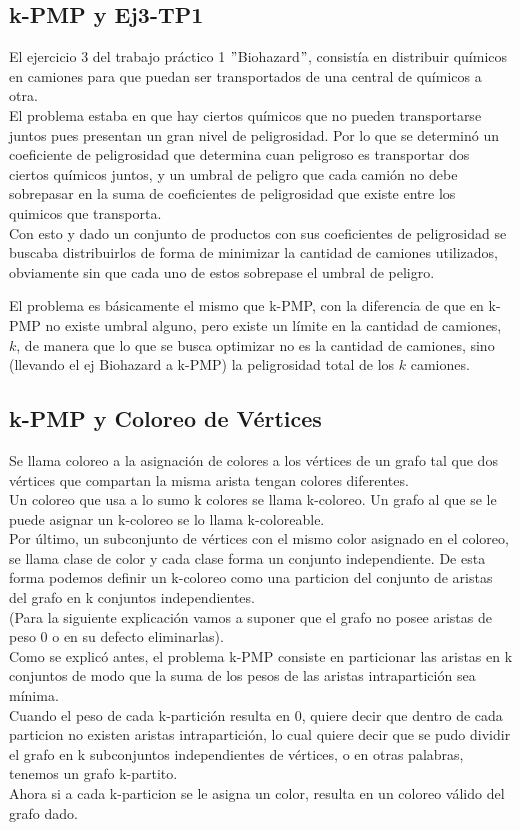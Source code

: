 \subsection{k-PMP y Ej3-TP1}

El ejercicio 3 del trabajo práctico 1 $"$Biohazard$"$, consistía en distribuir químicos en camiones para que puedan ser transportados de una central de químicos a otra.\\
El problema estaba en que hay ciertos químicos que no pueden transportarse juntos pues presentan un gran nivel de peligrosidad. Por lo que se determinó un coeficiente de peligrosidad que determina cuan peligroso es transportar dos ciertos químicos juntos, y un umbral de peligro que cada camión no debe sobrepasar en la suma de coeficientes de peligrosidad que existe entre los quimicos que transporta.\\
Con esto y dado un conjunto de productos con sus coeficientes de peligrosidad se buscaba distribuirlos de forma de minimizar la cantidad de camiones utilizados, obviamente sin que cada uno de estos sobrepase el umbral de peligro.

El problema es b\'asicamente el mismo que k-PMP, con la diferencia de que en k-PMP no existe umbral alguno, pero existe un l\'imite en la cantidad de camiones, $k$, de manera que lo que se busca optimizar no es la cantidad de camiones, sino (llevando el ej Biohazard a k-PMP) la peligrosidad total de los $k$ camiones.


\subsection{k-PMP y Coloreo de Vértices}

Se llama coloreo a la asignación de colores a los vértices de un grafo tal que dos vértices que compartan la misma arista tengan colores diferentes.\\
Un coloreo que usa a lo sumo k colores se llama k-coloreo. Un grafo al que se le puede asignar un k-coloreo se lo llama k-coloreable.\\
Por \'ultimo, un subconjunto de v\'ertices con el mismo color asignado en el coloreo, se llama clase de color y cada clase forma un conjunto independiente. De esta forma podemos definir un k-coloreo como una particion del conjunto de aristas del grafo en k conjuntos independientes.\\

(Para la siguiente explicaci\'on vamos a suponer que el grafo no posee aristas de peso 0 o en su defecto eliminarlas).\\
Como se explicó antes, el problema k-PMP consiste en particionar las aristas en k conjuntos de modo que la suma de los pesos de las aristas intrapartici\'on sea mínima.\\
Cuando el peso de cada k-partición resulta en 0, quiere decir que dentro de cada particion no existen aristas intrapartici\'on, lo cual quiere decir que se pudo dividir el grafo en k subconjuntos independientes de v\'ertices, o en otras palabras, tenemos un grafo k-partito.\\
Ahora si a cada k-particion se le asigna un color, resulta en un coloreo válido del grafo dado.



